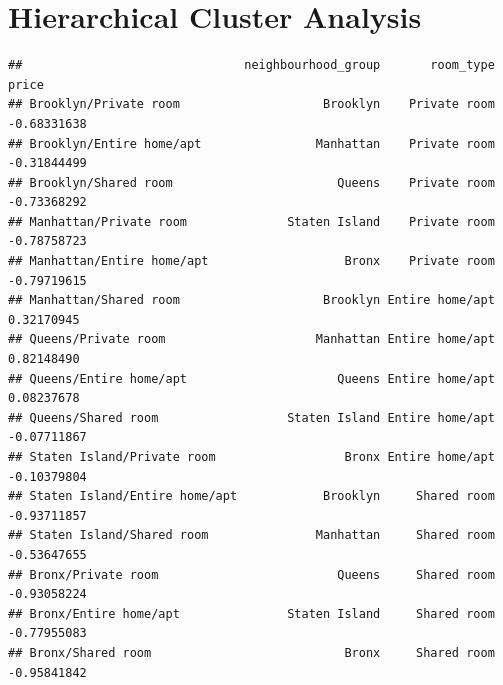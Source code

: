 \documentclass[
]{article}
\newenvironment{Shaded}{\begin{snugshade}}{\end{snugshade}}
\newcommand{\ControlFlowTok}[1]{\textcolor[rgb]{0.13,0.29,0.53}{\textbf{#1}}}
\newcommand{\KeywordTok}[1]{\textcolor[rgb]{0.13,0.29,0.53}{\textbf{#1}}}
\newcommand{\NormalTok}[1]{#1}
\newcommand{\OperatorTok}[1]{\textcolor[rgb]{0.81,0.36,0.00}{\textbf{#1}}}
\newcommand{\StringTok}[1]{\textcolor[rgb]{0.31,0.60,0.02}{#1}}
\begin{document}
\hypertarget{hierarchical-cluster-analysis}{%
\section{Hierarchical Cluster
Analysis}\label{hierarchical-cluster-analysis}}

\begin{Shaded}
\end{Shaded}

\begin{verbatim}
##                               neighbourhood_group       room_type       price
## Brooklyn/Private room                    Brooklyn    Private room -0.68331638
## Brooklyn/Entire home/apt                Manhattan    Private room -0.31844499
## Brooklyn/Shared room                       Queens    Private room -0.73368292
## Manhattan/Private room              Staten Island    Private room -0.78758723
## Manhattan/Entire home/apt                   Bronx    Private room -0.79719615
## Manhattan/Shared room                    Brooklyn Entire home/apt  0.32170945
## Queens/Private room                     Manhattan Entire home/apt  0.82148490
## Queens/Entire home/apt                     Queens Entire home/apt  0.08237678
## Queens/Shared room                  Staten Island Entire home/apt -0.07711867
## Staten Island/Private room                  Bronx Entire home/apt -0.10379804
## Staten Island/Entire home/apt            Brooklyn     Shared room -0.93711857
## Staten Island/Shared room               Manhattan     Shared room -0.53647655
## Bronx/Private room                         Queens     Shared room -0.93058224
## Bronx/Entire home/apt               Staten Island     Shared room -0.77955083
## Bronx/Shared room                           Bronx     Shared room -0.95841842
\end{verbatim}
\end{document}
